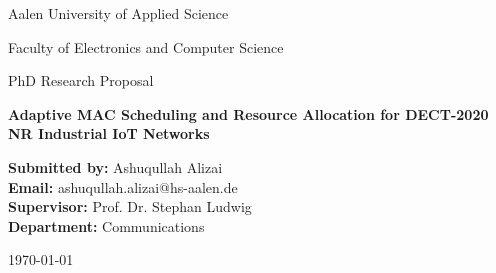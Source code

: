 \documentclass[12pt,a4paper]{article}
\begin{document}
\begin{titlepage}
    \centering
    
    {\Large Aalen University of Applied Science \par}
    \vspace{0.5cm}
    {\large Faculty of Electronics and Computer Science \par}
      \vspace{1cm}
    {\Large PhD Research Proposal \par}
    \vspace{6cm}
    
    {\Huge \textbf{Adaptive MAC Scheduling and Resource Allocation for DECT-2020 NR Industrial IoT Networks} \par}
    
    \vspace{1.5cm}
    
    
    
    \vspace{6cm}
    
    \begin{flushleft}
    \textbf{Submitted by:} Ashuqullah Alizai \\
    \textbf{Email:} ashuqullah.alizai@hs-aalen.de\\
    \textbf{Supervisor:} Prof. Dr. Stephan Ludwig \\
    \textbf{Department:} Communications  \\
    \end{flushleft}
    
    \vfill
    
    {\large \today \par}
    
\end{titlepage}
\end{document}
